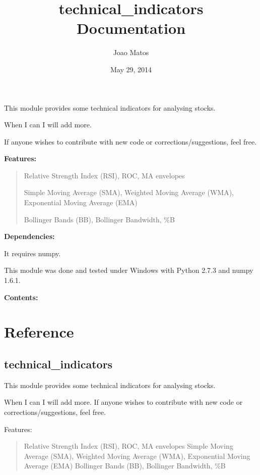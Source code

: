 \documentclass[letterpaper,10pt,english]{sphinxmanual}
\title{technical\_indicators Documentation}
\date{May 29, 2014}
\author{Joao Matos}
\begin{document}
\maketitle
\tableofcontents
{}\label{index::doc}


This module provides some technical indicators for analysing stocks.

When I can I will add more.

If anyone wishes to contribute with new code or corrections/suggestions, feel free.

\textbf{Features:}
\begin{quote}

Relative Strength Index (RSI), ROC, MA envelopes

Simple Moving Average (SMA), Weighted Moving Average (WMA), Exponential Moving Average (EMA)

Bollinger Bands (BB), Bollinger Bandwidth, \%B
\end{quote}

\textbf{Dependencies:}

It requires numpy.

This module was done and tested under Windows with Python 2.7.3 and numpy 1.6.1.

\textbf{Contents:}


\chapter{Reference}
\label{reference:welcome-to-technical-indicators-s-documentation}\label{reference::doc}\label{reference:reference}

\section{technical\_indicators}
\label{reference:technical-indicators}\label{reference:module-technical_indicators.technical_indicators}
This module provides some technical indicators for analysing stocks.

When I can I will add more.
If anyone wishes to contribute with new code or corrections/suggestions, feel
free.

Features:
\begin{quote}

Relative Strength Index (RSI), ROC, MA envelopes
Simple Moving Average (SMA), Weighted Moving Average (WMA), Exponential
Moving Average (EMA)
Bollinger Bands (BB), Bollinger Bandwidth, \%B
\end{quote}
\end{document}
